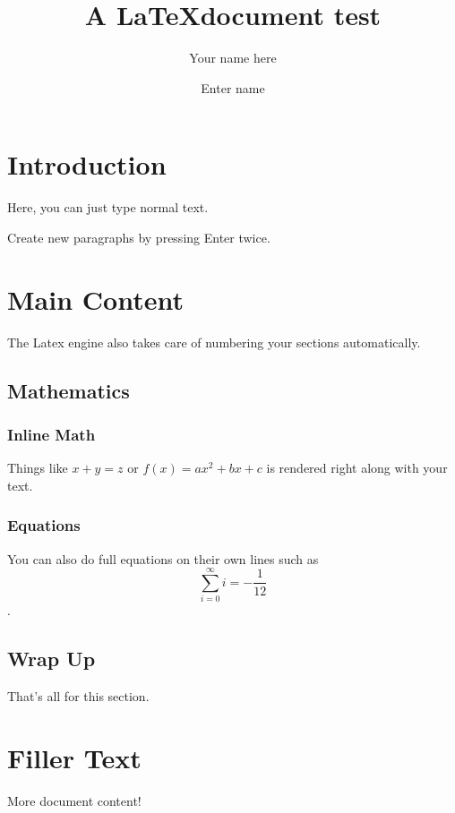 \documentclass[11pt,letterpaper]{article}
\author{Your name here}
\date{Enter name}
\title{A \LaTeX document test}
\begin{document}
\maketitle

\newpage

\tableofcontents

\section{Introduction}
Here, you can just type normal text.

Create new paragraphs by pressing Enter twice.

\section{Main Content}
The Latex engine also takes care of numbering your sections automatically. 

    \subsection{Mathematics}
        
        \subsubsection{Inline Math}
        Things like $x+y = z$ or $f(x)=ax^2 + bx + c$ is rendered right along with your text.
        
        \subsubsection{Equations}
        You can also do full equations on their own lines such as $$ \sum_{i=0}^\infty i = -\frac{1}{12} $$.
        
    \subsection{Wrap Up}
    That's all for this section.


\section{Filler Text}
More document content!
\end{document}
